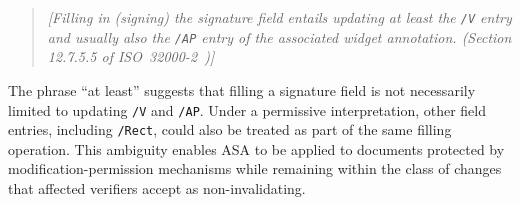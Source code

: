 \documentclass[12pt]{article}
\begin{document}
\begin{quote}
	\emph{[Filling in (signing) the signature field entails updating at least the \texttt{/V} entry and usually also the \texttt{/AP} entry of the associated widget annotation. (Section 12.7.5.5 of ISO~32000-2~\cite{iso32000-2})]}
\end{quote}

The phrase ``at least'' suggests that filling a signature field is not necessarily limited to updating \texttt{/V} and \texttt{/AP}. Under a permissive interpretation, other field entries, including \texttt{/Rect}, could also be treated as part of the same filling operation. This ambiguity enables ASA to be applied to documents protected by modification-permission mechanisms while remaining within the class of changes that affected verifiers accept as non-invalidating.
\end{document}
